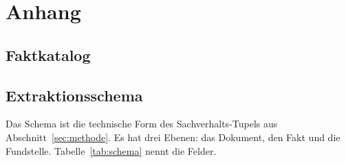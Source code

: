 
\appendix
\section{Anhang}

\subsection{Faktkatalog}
\label{app:faktkatalog}

\subsection{Extraktionsschema}
\label{app:schema}

Das Schema ist die technische Form des Sachverhalts-Tupels aus
Abschnitt~\ref{sec:methode}. Es hat drei Ebenen: das Dokument, den Fakt und die Fundstelle.
Tabelle~\ref{tab:schema} nennt die Felder.

